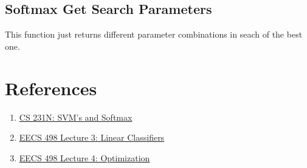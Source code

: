 \documentclass[12pt]{article}
\begin{document}
\subsection{Softmax Get Search Parameters}
This function just returns different parameter combinations in seach of the best one. 




\section{References}
\begin{enumerate}
    \item \href{https://cs231n.github.io/linear-classify/#svm-vs-softmax}{CS 231N: SVM's and Softmax }
    \item \href{https://www.youtube.com/watch?v=qcSEP17uKKY&list=PL5-TkQAfAZFbzxjBHtzdVCWE0Zbhomg7r}{EECS 498 Lecture 3: Linear Classifiers}
    \item \href{https://www.youtube.com/watch?v=YnQJTfbwBM8&list=PL5-TkQAfAZFbzxjBHtzdVCWE0Zbhomg7r&index=4}{EECS 498 Lecture 4: Optimization}
\end{enumerate}
\end{document}
